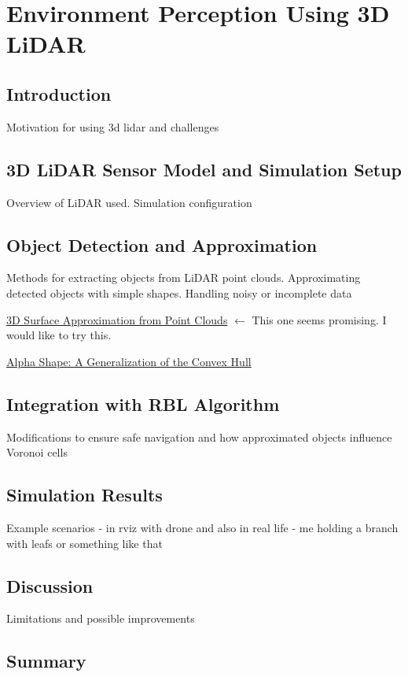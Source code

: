 \chapter{Environment Perception Using 3D LiDAR\label{chap:lidar}}

\section{Introduction}

Motivation for using 3d lidar and challenges

\section{3D LiDAR Sensor Model and Simulation Setup}

Overview of LiDAR used. Simulation configuration

\section{Object Detection and Approximation}

Methods for extracting objects from LiDAR point clouds. Approximating detected objects with simple shapes. Handling noisy or incomplete data


\href{https://groups.inf.ed.ac.uk/advr/papers/3D_Surface_Approximation_from_Point_Clouds.pdf}{3D Surface Approximation from Point Clouds} $\leftarrow$ This one seems promising. I would like to try this.


\href{https://en.wikipedia.org/wiki/Alpha_shape}{Alpha Shape: A Generalization of the Convex Hull}



\section{Integration with RBL Algorithm}

Modifications to ensure safe navigation and how approximated objects influence Voronoi cells

\section{Simulation Results}

Example scenarios - in rviz with drone and also in real life - me holding a branch with leafs or something like that

\section{Discussion}

Limitations and possible improvements

\section{Summary}
